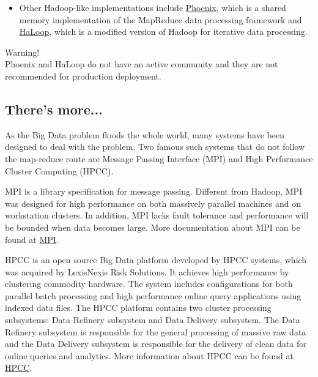 \begin{itemize}
  \item Other Hadoop-like implementations include \href{http://mapreduce.stanford.edu/}{Phoenix}, which is a shared memory implementation of the MapReduce data processing framework and \href{http://code.google.com/p/haloop/}{HaLoop}, which is a modified version of Hadoop for iterative data processing.
\end{itemize}

\begin{warning}
Warning! \\
Phoenix and HaLoop do not have an active community and they are not recommended for production deployment.
\end{warning} 

\subsection*{There's more...}
As the Big Data problem floods the whole world, many systems have been designed to deal with the problem. Two famous such systems that do not follow the map-reduce route are Message Passing Interface (MPI) and High Performance Cluster Computing (HPCC).
\begin{description}
  \item{MPI} is a library specification for message passing. Different from Hadoop, MPI was designed for high performance on both massively parallel machines and on workstation clusters. In addition, MPI lacks fault tolerance and performance will be bounded when data becomes large. More documentation about MPI can be found at \href{http://www.mpi-forum.org/}{MPI}.
  \item{HPCC} is an open source Big Data platform developed by HPCC systems, which was acquired by LexisNexis Risk Solutions. It achieves high performance by clustering commodity hardware. The system includes configurations for both parallel batch processing and high performance online query applications using indexed data files. The HPCC platform contains two cluster processing subsystems: Data Refinery subsystem and Data Delivery subsystem. The Data Refinery subsystem is responsible for the general processing of massive raw data and the Data Delivery subsystem is responsible for the delivery of clean data for online queries and analytics. More information about HPCC can be found at \href{http://hpccsystems.com/}{HPCC}.
\end{description}
